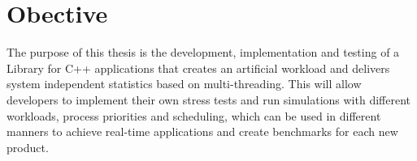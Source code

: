 \section{Obective}
The purpose of this thesis is the development, implementation and testing of a Library for C++ applications that creates an artificial workload and delivers system independent statistics based on multi-threading. This will allow developers to implement their own stress tests and run simulations with different workloads, process priorities and scheduling, which can be used in different manners to achieve real-time applications and create benchmarks for each new product. %


